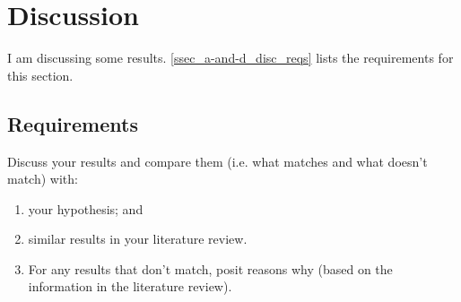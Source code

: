\section{Discussion}\label{sec_a-and-d_disc}
I am discussing some results. 
\autoref{ssec_a-and-d_disc_reqs} lists the requirements for this section.

\subsection{Requirements}\label{ssec_a-and-d_disc_reqs}
Discuss your results and compare them (i.e. what matches and what doesn't match) with:
\begin{enumerate}
    \item your hypothesis; and
    \item similar results in your literature review.
    \item For any results that don't match, posit reasons why (based on the information in the literature review).
\end{enumerate}